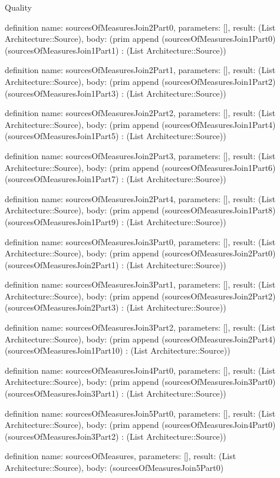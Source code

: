 \begin{lexlean}{Quality}
\begin{semanticmodule}
definition{
  name: sourcesOfMeasuresJoin2Part0,
  parameters: [],
  result: (List Architecture::Source),
  body: (prim append (sourcesOfMeasuresJoin1Part0) (sourcesOfMeasuresJoin1Part1) : (List Architecture::Source))
}

definition{
  name: sourcesOfMeasuresJoin2Part1,
  parameters: [],
  result: (List Architecture::Source),
  body: (prim append (sourcesOfMeasuresJoin1Part2) (sourcesOfMeasuresJoin1Part3) : (List Architecture::Source))
}

definition{
  name: sourcesOfMeasuresJoin2Part2,
  parameters: [],
  result: (List Architecture::Source),
  body: (prim append (sourcesOfMeasuresJoin1Part4) (sourcesOfMeasuresJoin1Part5) : (List Architecture::Source))
}

definition{
  name: sourcesOfMeasuresJoin2Part3,
  parameters: [],
  result: (List Architecture::Source),
  body: (prim append (sourcesOfMeasuresJoin1Part6) (sourcesOfMeasuresJoin1Part7) : (List Architecture::Source))
}

definition{
  name: sourcesOfMeasuresJoin2Part4,
  parameters: [],
  result: (List Architecture::Source),
  body: (prim append (sourcesOfMeasuresJoin1Part8) (sourcesOfMeasuresJoin1Part9) : (List Architecture::Source))
}

definition{
  name: sourcesOfMeasuresJoin3Part0,
  parameters: [],
  result: (List Architecture::Source),
  body: (prim append (sourcesOfMeasuresJoin2Part0) (sourcesOfMeasuresJoin2Part1) : (List Architecture::Source))
}

definition{
  name: sourcesOfMeasuresJoin3Part1,
  parameters: [],
  result: (List Architecture::Source),
  body: (prim append (sourcesOfMeasuresJoin2Part2) (sourcesOfMeasuresJoin2Part3) : (List Architecture::Source))
}

definition{
  name: sourcesOfMeasuresJoin3Part2,
  parameters: [],
  result: (List Architecture::Source),
  body: (prim append (sourcesOfMeasuresJoin2Part4) (sourcesOfMeasuresJoin1Part10) : (List Architecture::Source))
}

definition{
  name: sourcesOfMeasuresJoin4Part0,
  parameters: [],
  result: (List Architecture::Source),
  body: (prim append (sourcesOfMeasuresJoin3Part0) (sourcesOfMeasuresJoin3Part1) : (List Architecture::Source))
}

definition{
  name: sourcesOfMeasuresJoin5Part0,
  parameters: [],
  result: (List Architecture::Source),
  body: (prim append (sourcesOfMeasuresJoin4Part0) (sourcesOfMeasuresJoin3Part2) : (List Architecture::Source))
}

definition{
  name: sourcesOfMeasures,
  parameters: [],
  result: (List Architecture::Source),
  body: (sourcesOfMeasuresJoin5Part0)
}
\end{semanticmodule}
\end{lexlean}
